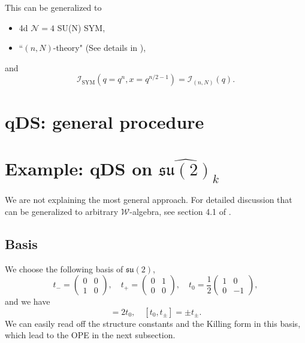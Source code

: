 \documentclass[a4paper,11pt]{article}
\begin{document}
This can be generalized to
\begin{itemize}
    \item 4d $\mathcal{N}=4$ SU(N) SYM,
    \item ``$(n,N)$-theory" (See details in \cite{Buican:2020moo}),
\end{itemize}
and
\begin{equation}
    \mathcal{I}_\mathrm{SYM} (q = q^n, x= q^{n/2-1}) = \mathcal{I}_{(n,N)} (q).
\end{equation}


\newpage
\appendix
\section{qDS: general procedure}

\section{Example: qDS on $\widehat{\mathfrak{su}(2)}_k$}
We are not explaining the most general approach. For detailed discussion that can be generalized to arbitrary $\mathcal{W}$-algebra, see section 4.1 of \cite{Beem:2014rza}.

\subsection{Basis}
We choose the following basis of $\mathfrak{su}(2)$,
\begin{equation}
    t_- = \begin{pmatrix}
        0 & 0\\
        1 & 0
    \end{pmatrix}, \quad t_+ = \begin{pmatrix}
        0 & 1\\
        0 & 0
    \end{pmatrix}, \quad t_0 = \frac{1}{2}\begin{pmatrix}
        1 & 0\\
        0 & -1
    \end{pmatrix},
\end{equation}
and we have
\begin{equation}
    [t_+, t_-]=2t_0, \quad [t_0, t_\pm] = \pm t_\pm.
\end{equation}
We can easily read off the structure constants and the Killing form in this basis, which lead to the OPE in the next subsection.
\end{document}
